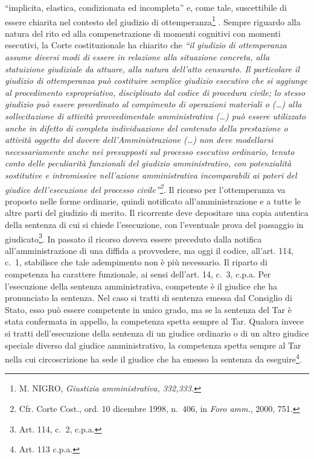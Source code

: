 \documentclass[12pt,it,a4paper,]{report}
\begin{document}
``implicita, elastica, condizionata ed incompleta'' e, come tale,
suscettibile di essere chiarita nel contesto del giudizio di
ottemperanza\footnote{M. NIGRO, \emph{Giustizia amministrativa,
  332,333.}} . Sempre riguardo alla natura del rito ed alla
compenetrazione di momenti cognitivi con momenti esecutivi, la Corte
costituzionale ha chiarito che \emph{``il giudizio di ottemperanza
assume diversi modi di essere in relazione alla situazione concreta,
alla statuizione giudiziale da attuare, alla natura dell'atto censurato.
Il particolare il giudizio di ottemperanza può costituire semplice
giudizio esecutivo che si aggiunge al procedimento espropriativo,
disciplinato dal codice di procedura civile; lo stesso giudizio può
essere preordinato al compimento di operazioni materiali o (\ldots) alla
sollecitazione di attività provvedimentale amministrativa (\ldots) può
essere utilizzato anche in difetto di completa individuazione del
contenuto della prestazione o attività oggetto del dovere
dell'Amministrazione (\ldots) non deve modellarsi necessariamente anche
nei presupposti sul processo esecutivo ordinario, tenuto conto delle
peculiarità funzionali del giudizio amministrativo, con potenzialità
sostitutive e intromissive nell'azione amministrativa incomparabili ai
poteri del giudice dell'esecuzione del processo civile''\footnote{Cfr.
  Corte Cost., ord. 10 dicembre 1998, n.~406, in \emph{Foro amm.}, 2000,
  751.}.} Il ricorso per l'ottemperanza va proposto nelle forme
ordinarie, quindi notificato all'amministrazione e a tutte le altre
parti del giudizio di merito. Il ricorrente deve depositare una copia
autentica della sentenza di cui si chiede l'esecuzione, con l'eventuale
prova del passaggio in giudicato\footnote{Art. 114, c.~2, c.p.a.}. In
passato il ricorso doveva essere preceduto dalla notifica
all'amministrazione di una diffida a provvedere, ma oggi il codice,
all'art. 114, c.~1, stabilisce che tale adempimento non è più
necessario. Il riparto di competenza ha carattere funzionale, ai sensi
dell'art. 14, c.~3, c.p.a. Per l'esecuzione della sentenza
amministrativa, competente è il giudice che ha pronunciato la sentenza.
Nel caso si tratti di sentenza emessa dal Consiglio di Stato, esso può
essere competente in unico grado, ma se la sentenza del Tar è stata
confermata in appello, la competenza spetta sempre al Tar. Qualora
invece si tratti dell'esecuzione della sentenza di un giudice ordinario
o di un altro giudice speciale diverso dal giudice amministrativo, la
competenza spetta sempre al Tar nella cui circoscrizione ha sede il
giudice che ha emesso la sentenza da eseguire\footnote{Art. 113 c.p.a.}.
\end{document}
